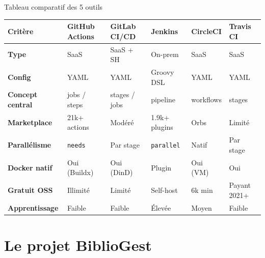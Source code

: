 \documentclass[aspectratio=169,12pt]{beamer}
\begin{document}
\begin{frame}{Tableau comparatif des 5 outils}
  \centering
  \scriptsize
  \renewcommand{\arraystretch}{1.3}
  \begin{tabular}{>{\bfseries}p{2.3cm} p{1.9cm} p{1.9cm} p{1.9cm} p{1.9cm} p{1.7cm}}
    \toprule
    Critère & GitHub Actions & GitLab CI/CD & Jenkins & CircleCI & Travis CI \\
    \midrule
    Type             & SaaS              & SaaS + SH     & On-prem        & SaaS        & SaaS \\
    Config           & YAML              & YAML          & Groovy DSL     & YAML        & YAML \\
    Concept central  & jobs / steps      & stages / jobs & pipeline       & workflows   & stages \\
    Marketplace      & 21k+ actions      & Modéré        & 1.9k+ plugins  & Orbs        & Limité \\
    Parallélisme     & \texttt{needs}    & Par stage     & \texttt{parallel} & Natif    & Par stage \\
    Docker natif     & Oui (Buildx)      & Oui (DinD)    & Plugin         & Oui (VM)    & Oui \\
    Gratuit OSS      & \textcolor{vertCode}{Illimité} & Limité & Self-host & 6k min   & \textcolor{red!70!black}{Payant 2021+} \\
    Apprentissage    & \textcolor{vertCode}{Faible} & \textcolor{vertCode}{Faible} & \textcolor{red!70!black}{Élevée} & Moyen & \textcolor{vertCode}{Faible} \\
    \bottomrule
  \end{tabular}
\end{frame}

\section{Le projet BiblioGest}
\end{document}
